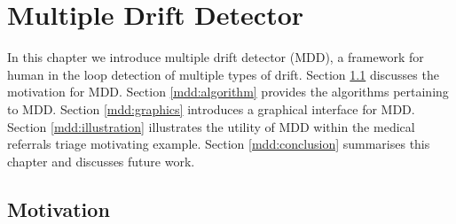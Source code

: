 \chapter{Multiple Drift Detector} \label{chapt:MDD}

In this chapter we introduce multiple drift detector (MDD), a framework for human in the loop detection of multiple types of drift. Section \ref{mdd:motivation} discusses the motivation for MDD. Section \ref{mdd:algorithm} provides the algorithms pertaining to MDD. Section \ref{mdd:graphics} introduces a graphical interface for MDD. Section \ref{mdd:illustration} illustrates the utility of MDD within the medical referrals triage motivating example. Section \ref{mdd:conclusion} summarises this chapter and discusses future work.


\section{Motivation} \label{mdd:motivation}

